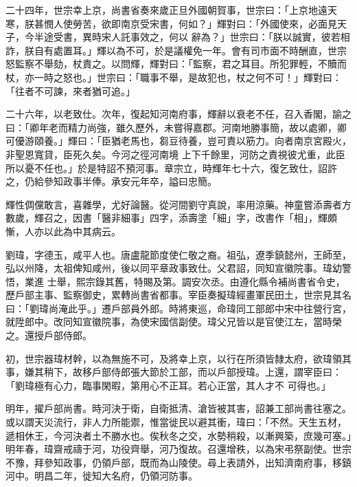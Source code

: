 \begin{pinyinscope}
 二十四年，世宗幸上京，尚書省奏來歲正旦外國朝賀事，世宗曰：「上京地遠天寒，朕甚憫人使勞苦，欲即南京受宋書，何如？」輝對曰：「外國使來，必面見天子，今半途受書，異時宋人託事效之，何以
 辭為？」世宗曰：「朕以誠實，彼若相詐，朕自有處置耳。」輝以為不可，於是議權免一年。會有司市面不時酬直，世宗怒監察不舉劾，杖責之。以問輝，輝對曰：「監察，君之耳目。所犯罪輕，不贖而杖，亦一時之怒也。」世宗曰：「職事不舉，是故犯也，杖之何不可！」輝對曰：「往者不可諫，來者猶可追。」



 二十六年，以老致仕。次年，復起知河南府事，輝辭以衰老不任，召入香閣，諭之曰：「卿年老而精力尚強，雖久歷外，未嘗得嘉郡。河南地勝事簡，故以處卿，卿可優游頤養。」輝曰：「臣猶老馬也，芻豆待養，豈可責以筋力。向者南京宮殿火，非聖恩寬貸，臣死久矣。今河之徑河南境
 上下千餘里，河防之責視彼尤重，此臣所以憂不任也。」於是特詔不預河事。章宗立，時輝年七十六，復乞致仕，詔許之，仍給參知政事半俸。承安元年卒，謚曰忠簡。



 輝性倜儻敢言，喜雜學，尤好論醫。從河間劉守真說，率用涼藥。神童嘗添壽者方數歲，輝召之，因書「醫非細事」四字，添壽塗「細」字，改書作「相」，輝頗慚，人亦以此為中其病云。



 劉瑋，字德玉，咸平人也。唐盧龍節度使仁敬之裔。祖弘，遼季鎮懿州，王師至，弘以州降，太祖俾知咸州，後以同平章政事致仕。父君詔，同知宣徽院事。瑋幼警悟，業進
 士舉，熙宗錄其舊，特賜及第。調安次丞。由遵化縣令補尚書省令史，歷戶部主事、監察御史，累轉尚書省都事。宰臣奏擬瑋經畫軍民田土，世宗見其名曰：「劉瑋尚淹此乎。」遷戶部員外郎。時將東巡，命瑋同工部郎中宋中往營行宮，就陞郎中。改同知宣徽院事，為使宋國信副使。瑋父兄皆以是官使江左，當時榮之。還授戶部侍郎。



 初，世宗器瑋材幹，以為無施不可，及將幸上京，以行在所須皆隸太府，欲瑋領其事，嫌其稍下，故移戶部侍郎張大節於工部，而以戶部授瑋。上還，謂宰臣曰：「劉瑋極有心力，臨事閑暇，第用心不正耳。若心正當，其人才不
 可得也。」



 明年，擢戶部尚書。時河決于衛，自衛抵清、滄皆被其害，詔兼工部尚書往塞之。或以謂天災流行，非人力所能禦，惟當徙民以避其衝，瑋曰：「不然。天生五材，遞相休王，今河決者土不勝水也。俟秋冬之交，水勢稍殺，以漸興築，庶幾可塞。」明年春，瑋齋戒禱于河，功役齊舉，河乃復故。召還增秩，以為宋弔祭副使。世宗不豫，拜參知政事，仍領戶部，既而為山陵使。尋上表請外，出知濟南府事，移鎮河中。明昌二年，徙知大名府，仍領河防事。




\end{pinyinscope}
